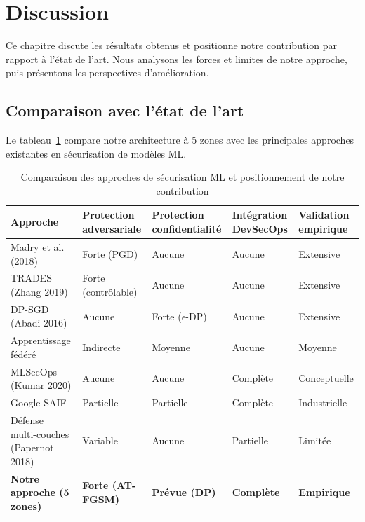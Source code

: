 \section{Discussion}

Ce chapitre discute les résultats obtenus et positionne notre contribution par rapport à l'état de l'art. Nous analysons les forces et limites de notre approche, puis présentons les perspectives d'amélioration.

\subsection{Comparaison avec l'état de l'art}

Le tableau~\ref{tab:state_of_art_5zones} compare notre architecture à 5 zones avec les principales approches existantes en sécurisation de modèles ML.

\begin{table}[H]
    \centering
    \caption{Comparaison des approches de sécurisation ML et positionnement de notre contribution}
    \label{tab:state_of_art_5zones}
    \small
    \begin{tabular}{|p{2.8cm}|p{2.3cm}|p{2.3cm}|p{2.3cm}|p{2.3cm}|}
        \hline
        \textbf{Approche} & \textbf{Protection adversariale} & \textbf{Protection confidentialité} & \textbf{Intégration DevSecOps} & \textbf{Validation empirique} \\
        \hline
        Madry et al. (2018) & \cellcolor{green!25}Forte (PGD) & \cellcolor{red!25}Aucune & \cellcolor{red!25}Aucune & \cellcolor{green!25}Extensive \\
        \hline
        TRADES (Zhang 2019) & \cellcolor{green!25}Forte (contrôlable) & \cellcolor{red!25}Aucune & \cellcolor{red!25}Aucune & \cellcolor{green!25}Extensive \\
        \hline
        DP-SGD (Abadi 2016) & \cellcolor{red!25}Aucune & \cellcolor{green!25}Forte ($\epsilon$-DP) & \cellcolor{red!25}Aucune & \cellcolor{green!25}Extensive \\
        \hline
        Apprentissage fédéré & \cellcolor{yellow!25}Indirecte & \cellcolor{yellow!25}Moyenne & \cellcolor{red!25}Aucune & \cellcolor{yellow!25}Moyenne \\
        \hline
        MLSecOps (Kumar 2020) & \cellcolor{red!25}Aucune & \cellcolor{red!25}Aucune & \cellcolor{green!25}Complète & \cellcolor{red!25}Conceptuelle \\
        \hline
        Google SAIF & \cellcolor{yellow!25}Partielle & \cellcolor{yellow!25}Partielle & \cellcolor{green!25}Complète & \cellcolor{yellow!25}Industrielle \\
        \hline
        Défense multi-couches (Papernot 2018) & \cellcolor{yellow!25}Variable & \cellcolor{red!25}Aucune & \cellcolor{yellow!25}Partielle & \cellcolor{red!25}Limitée \\
        \hline
        \textbf{Notre approche (5 zones)} & \cellcolor{green!25}\textbf{Forte (AT-FGSM)} & \cellcolor{yellow!25}\textbf{Prévue (DP)} & \cellcolor{green!25}\textbf{Complète} & \cellcolor{green!25}\textbf{Empirique} \\
        \hline
    \end{tabular}
\end{table}


